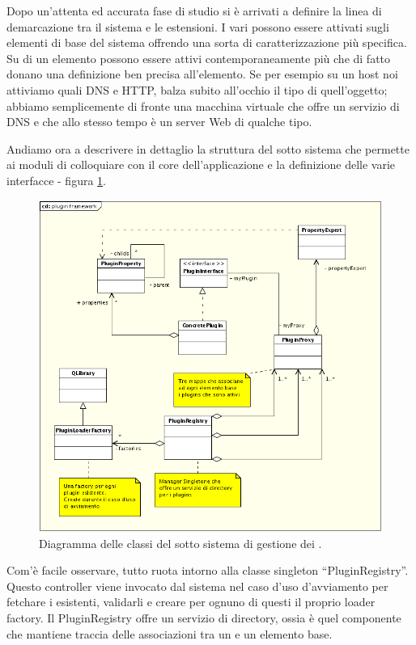 Dopo un'attenta ed accurata fase di studio si è arrivati a definire la linea di demarcazione tra il sistema e le estensioni. I vari \plugin{} possono essere attivati sugli elementi di base del sistema offrendo una sorta di caratterizzazione più specifica. Su di un elemento possono essere attivi contemporaneamente più \plugin{} che di fatto donano una definizione ben precisa all'elemento. Se per esempio su un host noi attiviamo \plugin{} quali DNS e HTTP, balza subito all'occhio il tipo di quell'oggetto; abbiamo semplicemente di fronte una macchina virtuale che offre un servizio di DNS e che allo stesso tempo è un server Web di qualche tipo.

Andiamo ora a descrivere in dettaglio la struttura del sotto sistema che permette ai moduli di colloquiare con il core dell'applicazione e la definizione delle varie interfacce - figura \ref{figura:uml_plugin_framework}.

\begin{figure}[!htb]
	\centering
	\includegraphics[width=12cm]{images/plugin_framework_uml.png}
	\caption{Diagramma delle classi del sotto sistema di gestione dei \plugin{}.}
	\label{figura:uml_plugin_framework}
\end{figure}

Com'è facile osservare, tutto ruota intorno alla classe singleton ``PluginRegistry''. Questo controller viene invocato dal sistema nel caso d'uso d'avviamento per fetchare i \plugin{} esistenti, validarli e creare per ognuno di questi il proprio loader factory. Il PluginRegistry offre un servizio di directory, ossia è quel componente che mantiene traccia delle associazioni tra un \plugin{} e un elemento base.

